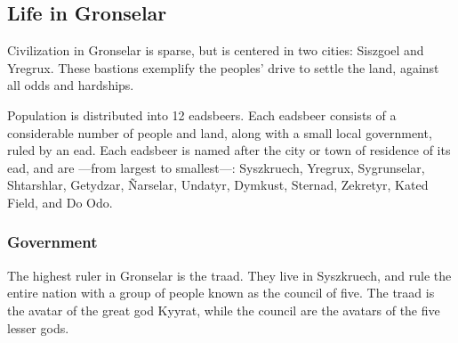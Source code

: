 



\subsection*{Life in Gronselar}
Civilization in Gronselar is sparse, but is centered in two cities: Siszgoel and Yregrux.
These bastions exemplify the peoples' drive to settle the land, against all odds and hardships.

Population is distributed into 12 eadsbeers.
Each eadsbeer consists of a considerable number of people and land, along with a small local government, ruled by an ead.
Each eadsbeer is named after the city or town of residence of its ead, and are ---from largest to smallest---: Syszkruech, Yregrux, Sygrunselar, Shtarshlar, Getydzar, \~Narselar, Undatyr, Dymkust, Sternad, Zekretyr, Kated Field, and Do Odo.

\subsubsection{Government}
The highest ruler in Gronselar is the traad.
They live in Syszkruech, and rule the entire nation with a group of people known as the council of five.
The traad is the avatar of the great god Kyyrat, while the council are the avatars of the five lesser gods.

